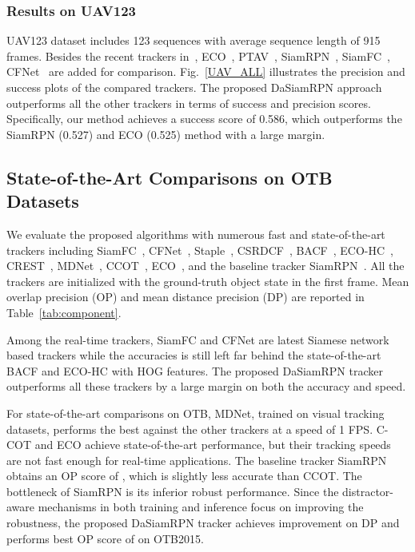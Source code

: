 \documentclass[runningheads]{llncs}
\begin{document}
\subsubsection{Results on UAV123}
UAV123 dataset includes 123 sequences with average sequence length of 915 frames. Besides the recent trackers in~\cite{UAV}, ECO~\cite{ECO}, PTAV~\cite{PTAV}, SiamRPN~\cite{SiamRPN}, SiamFC~\cite{SiamFC}, CFNet~\cite{CFNet} are added for comparison. Fig.~\ref{UAV_ALL} illustrates the precision and success plots of the compared trackers. The proposed DaSiamRPN approach outperforms all the other trackers in terms of success and precision scores. Specifically, our method achieves a success score of 0.586, which outperforms the SiamRPN (0.527) and ECO (0.525) method with a large margin.


\subsection{State-of-the-Art Comparisons on OTB Datasets}

\label{sect:otb}

We evaluate the proposed algorithms with numerous fast and state-of-the-art trackers including SiamFC~\cite{SiamFC}, CFNet~\cite{CFNet}, Staple~\cite{Staple}, CSRDCF~\cite{CSRDCF}, BACF~\cite{BACF}, ECO-HC~\cite{ECO}, CREST~\cite{CREST}, MDNet~\cite{MDNet}, CCOT~\cite{CCOT}, ECO~\cite{ECO}, and the baseline tracker SiamRPN~\cite{SiamRPN}. All the trackers are initialized with the ground-truth object state in the first frame. Mean overlap precision (OP) and mean distance precision (DP) are reported in Table~\ref{tab:component}.

Among the real-time trackers, SiamFC and CFNet are latest Siamese network based trackers while the accuracies is still left far behind the state-of-the-art BACF and ECO-HC with HOG features. The proposed DaSiamRPN tracker outperforms all these trackers by a large margin on both the accuracy and speed.

For state-of-the-art comparisons on OTB, MDNet, trained on visual tracking datasets, performs the best against the other trackers at a speed of 1 FPS. C-COT and ECO achieve state-of-the-art performance, but their tracking speeds are not fast enough for real-time applications. The baseline tracker SiamRPN obtains an OP score of , which is slightly less accurate than CCOT. The bottleneck of SiamRPN is its inferior robust performance. Since the distractor-aware mechanisms in both training and inference focus on improving the robustness, the proposed DaSiamRPN tracker achieves  improvement on DP and performs best OP score of  on OTB2015.
\end{document}
